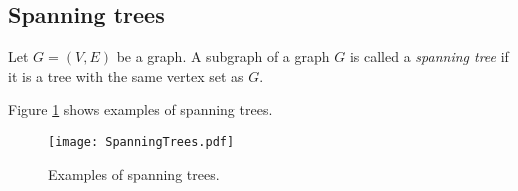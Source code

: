 \begin{page}
\setcounter{section}{2}
\setcounter{subsection}{4}
\setcounter{dfn}{9}
\label{portion:237}




\end{page}

\begin{page}
\setcounter{section}{2}
\setcounter{subsection}{4}
\setcounter{dfn}{9}
\label{portion:238}

\subsection{Spanning trees}

\end{page}

\begin{page}
\setcounter{section}{2}
\setcounter{subsection}{4}
\setcounter{dfn}{10}
\label{portion:240}

\begin{dfn}
Let $G = (V, E)$ be a graph.
A subgraph of a graph $G$ is called a \emph{spanning tree} if it is a tree with the same vertex set as $G$.
\end{dfn}

\end{page}

\begin{page}
\setcounter{section}{2}
\setcounter{subsection}{4}
\setcounter{dfn}{10}
\label{portion:241}


Figure \ref{fig:SpanningTrees} shows examples of spanning trees.

\begin{figure}[ht]
\begin{center}
\texttt{[image: SpanningTrees.pdf]}
\end{center}
\caption{Examples of spanning trees.}
\label{fig:SpanningTrees}
\end{figure}


\end{page}

